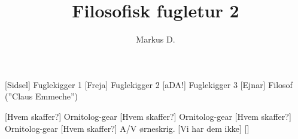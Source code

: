 \documentclass[a4paper,12pt]{article}
\title{Filosofisk fugletur 2}
\author{Markus D.}
\begin{document}
\maketitle




\begin{roles}
	[Sidsel] Fuglekigger 1
	[Freja] Fuglekigger 2
	[aDA!] Fuglekigger 3
	[Ejnar] Filosof (''Claus Emmeche'')
\end{roles}


\begin{props}
	[Hvem skaffer?] Ornitolog-gear
	[Hvem skaffer?] Ornitolog-gear
	[Hvem skaffer?] Ornitolog-gear
	[Hvem skaffer?] A/V ørneskrig.
	 [Vi har dem ikke]
\end{props}
\end{document}
